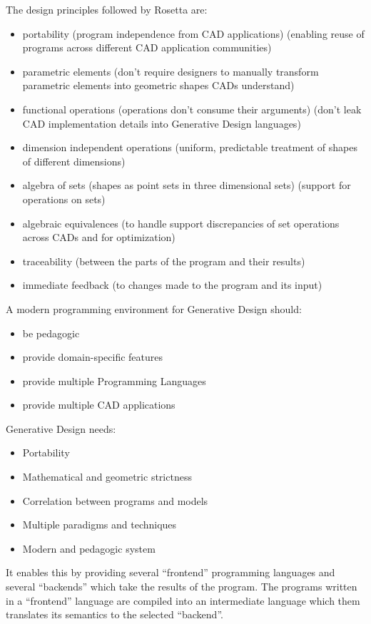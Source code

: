 \documentclass{./llncs2e/llncs}
\begin{document}
	The design principles followed by Rosetta are:
	\begin{itemize}
		\item portability (program independence from CAD applications) (enabling reuse of programs across different CAD application communities)
		\item parametric elements (don't require designers to manually transform parametric elements into geometric shapes CADs understand)
		\item functional operations (operations don't consume their arguments) (don't leak CAD implementation details into Generative Design languages)
		\item dimension independent operations (uniform, predictable treatment of shapes of different dimensions)
		\item algebra of sets (shapes as point sets in three dimensional sets) (support for operations on sets)
		\item algebraic equivalences (to handle support discrepancies of set operations across CADs and for optimization)
		\item traceability (between the parts of the program and their results)
		\item immediate feedback (to changes made to the program and its input)
	\end{itemize}

	A modern programming environment for Generative Design should:
	\begin{itemize}
		\item be pedagogic
		\item provide domain-specific features
		\item provide multiple Programming Languages
		\item provide multiple CAD applications
	\end{itemize}

	Generative Design needs:
	\begin{itemize}
		\item Portability
		\item Mathematical and geometric strictness
		\item Correlation between programs and models
		\item Multiple paradigms and techniques
		\item Modern and pedagogic system
	\end{itemize}

	It enables this by providing several ``frontend'' programming languages and several ``backends'' which take the results of the program. 
	The programs written in a ``frontend'' language are compiled into an intermediate language which them translates its semantics to the selected ``backend''.
\end{document}
